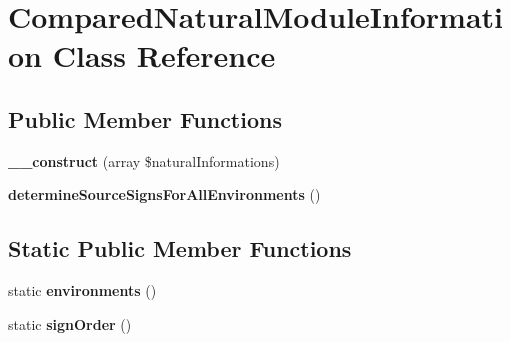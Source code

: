 \hypertarget{class_compared_natural_module_information}{}\section{Compared\+Natural\+Module\+Information Class Reference}
\label{class_compared_natural_module_information}
\subsection*{Public Member Functions}
\begin{DoxyCompactItemize}
\item 
{\bfseries \+\_\+\+\_\+construct} (array \$natural\+Informations)\hypertarget{class_compared_natural_module_information_a306e43cb9626d49dafd5701a8fd24cb5}{}\label{class_compared_natural_module_information_a306e43cb9626d49dafd5701a8fd24cb5}

\item 
{\bfseries determine\+Source\+Signs\+For\+All\+Environments} ()\hypertarget{class_compared_natural_module_information_a2966f51e3b800c5581220ec215487109}{}\label{class_compared_natural_module_information_a2966f51e3b800c5581220ec215487109}

\end{DoxyCompactItemize}
\subsection*{Static Public Member Functions}
\begin{DoxyCompactItemize}
\item 
static {\bfseries environments} ()\hypertarget{class_compared_natural_module_information_a0bd5c465aad785e218e5524c9e36c9cb}{}\label{class_compared_natural_module_information_a0bd5c465aad785e218e5524c9e36c9cb}

\item 
static {\bfseries sign\+Order} ()\hypertarget{class_compared_natural_module_information_a3532b80eecc0d25512c7645a4c5b61d7}{}\label{class_compared_natural_module_information_a3532b80eecc0d25512c7645a4c5b61d7}

\end{DoxyCompactItemize}
